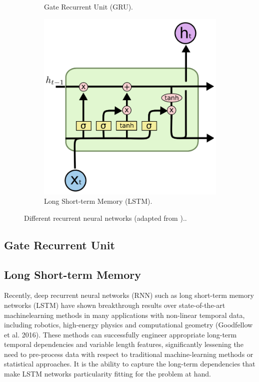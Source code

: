 \begin{figure}[h]
\begin{subfigure}[t]{0.3\textwidth}
        \caption{Gate Recurrent Unit (GRU).} \label{fig:gru}
    \end{subfigure}%
    \hspace{1em}
    \begin{subfigure}[t]{0.3\textwidth}
      \includegraphics[width=\linewidth]{imgs/models/lstm-2.png}
      \caption{Long Short-term Memory (LSTM).} \label{fig:lstm}
    \end{subfigure}%
  \caption{Different recurrent neural networks (adapted from \citet{olahUnderstandingLSTMNetworks2015})..} \label{fig:recurrent-nn}
\end{figure}


\subsection{Gate Recurrent Unit}

\subsection{Long Short-term Memory}
Recently, deep recurrent neural networks (RNN) such as long short-term memory networks (LSTM) have shown breakthrough results over state-of-the-art machinelearning methods in many applications with non-linear temporal data, including robotics, high-energy physics and computational geometry (Goodfellow et al. 2016). These methods can successfully engineer appropriate long-term temporal dependencies and variable length features, significantly lessening the need to pre-process data with respect to traditional machine-learning methods or statistical approaches. It is the ability to capture the long-term dependencies that make LSTM networks particularity fitting for the problem at hand. 

